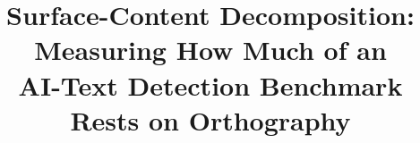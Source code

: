 \documentclass[conference,a4paper]{IEEEtran}
\makeatletter
\newcommand{\linebreakand}{%
  \end{@IEEEauthorhalign}
  \hfill\mbox{}\par
  \mbox{}\hfill\begin{@IEEEauthorhalign}
}
\makeatother
\begin{document}
\title{\LARGE Surface-Content Decomposition: Measuring How Much of an\\AI-Text Detection Benchmark Rests on Orthography}


\maketitle
\end{document}
